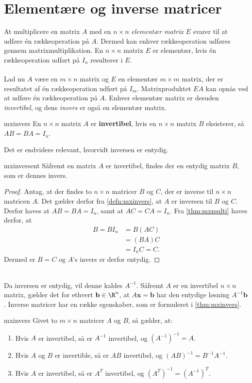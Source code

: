 \section{Elementære og inverse matricer}
At multiplicere en matrix $A$ med en $n \times n$ \textit{elementær matrix} $E$ svarer til at udføre én rækkeoperation på $A$. 
Dermed kan enhver rækkeoperation udføres gennem matrixmultiplikation. 
En $n \times n$ matrix $E$ er elementær, hvis én rækkeoperation udført på $I_n$ resulterer i $E$. 
\\\\
Lad nu $A$ være en $m \times n$ matrix og $E$ en elementær $m \times m$ matrix, der er resultatet af én rækkeoperation udført på $I_m$. 
Matrixproduktet $EA$ kan opnås ved at udføre én rækkeoperation på $A$. 
Enhver elementær matrix er desuden \textit{invertibel}, og dens \textit{invers} er også en elementær matrix. 
%
\begin{defn}{}{mxinvers}
En $n \times n$ matrix $A$ er \textbf{invertibel}, hvis en $n \times n$ matrix $B$ eksisterer, så $AB=BA=I_n$. 
\end{defn}
\noindent
%
Det er endvidere relevant, hvorvidt inversen er entydig.
\begin{thm}{}{mxinversent}
Såfremt en matrix $A$ er invertibel, findes der en entydig matrix $B$, som er dennes invers.
\end{thm}
%
\begin{proof}
Antag, at der findes to $n \times n$ matricer  $B$ og $C$, der er inverse til $n \times n$ matricen $A$.
Det gælder derfor fra \ref{defn:mxinvers}, at $A$ er inversen til $B$ og $C$.
Derfor haves at $AB=BA=I_{n}$, samt at $AC=CA=I_{n}$. 
Fra \ref{thm:mxmulti} haves derfor, at
\begin{align*}
B=BI_n&=B(AC) \\
&=(BA)C \\
&=I_nC=C.
\end{align*} 
Dermed er $B=C$ og $A$'s invers er derfor entydig.
\end{proof} \\
%
Da inversen er entydig, vil denne kaldes $A^{-1}$.
Såfremt $A$ er en invertibel $n \times n$ matrix, gælder det for ethvert $\mathbf{b} \in \R^n$, at $A\textbf{x}=\mathbf{b}$ har den entydige løsning $A^{-1}\mathbf{b}$.
Inverse matricer har en række egenskaber, som er formuleret i \ref{thm:mxinvers}. 
%
\begin{thm}{}{mxinvers}
Givet to $m \times n$ matricer $A$ og $B$, så gælder, at:
\begin{enumerate}[label=(\alph*)]
\item Hvis $A$ er invertibel, så er $A^{-1}$ invertibel, og $(A^{-1})^{-1}=A$.
\item Hvis $A$ og $B$ er invertible, så er $AB$ invertibel, og $(AB)^{-1}=B^{-1}A^{-1}$.
\item Hvis $A$ er invertibel, så er $A^T$ invertibel, og $(A^T)^{-1}=(A^{-1})^T$.
\end{enumerate}
\end{thm}
